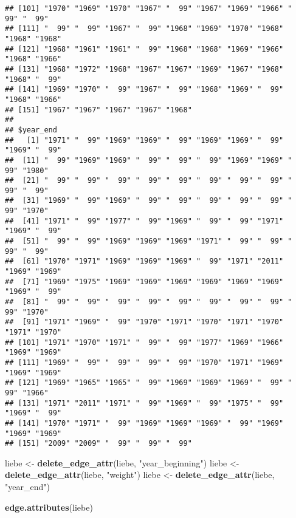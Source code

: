 \documentclass[
]{article}
\newenvironment{Shaded}{\begin{snugshade}}{\end{snugshade}}
\newcommand{\KeywordTok}[1]{\textcolor[rgb]{0.13,0.29,0.53}{\textbf{#1}}}
\newcommand{\NormalTok}[1]{#1}
\newcommand{\StringTok}[1]{\textcolor[rgb]{0.31,0.60,0.02}{#1}}
\begin{document}
\begin{verbatim}
## [101] "1970" "1969" "1970" "1967" "  99" "1967" "1969" "1966" "  99" "  99"
## [111] "  99" "  99" "1967" "  99" "1968" "1969" "1970" "1968" "1968" "1968"
## [121] "1968" "1961" "1961" "  99" "1968" "1968" "1969" "1966" "1968" "1966"
## [131] "1968" "1972" "1968" "1967" "1967" "1969" "1967" "1968" "1968" "  99"
## [141] "1969" "1970" "  99" "1967" "  99" "1968" "1969" "  99" "1968" "1966"
## [151] "1967" "1967" "1967" "1967" "1968"
## 
## $year_end
##   [1] "1971" "  99" "1969" "1969" "  99" "1969" "1969" "  99" "1969" "  99"
##  [11] "  99" "1969" "1969" "  99" "  99" "  99" "1969" "1969" "  99" "1980"
##  [21] "  99" "  99" "  99" "  99" "  99" "  99" "  99" "  99" "  99" "  99"
##  [31] "1969" "  99" "1969" "  99" "  99" "  99" "  99" "  99" "  99" "1970"
##  [41] "1971" "  99" "1977" "  99" "1969" "  99" "  99" "1971" "1969" "  99"
##  [51] "  99" "  99" "1969" "1969" "1969" "1971" "  99" "  99" "  99" "  99"
##  [61] "1970" "1971" "1969" "1969" "1969" "  99" "1971" "2011" "1969" "1969"
##  [71] "1969" "1975" "1969" "1969" "1969" "1969" "1969" "1969" "1969" "  99"
##  [81] "  99" "  99" "  99" "  99" "  99" "  99" "  99" "  99" "  99" "1970"
##  [91] "1971" "1969" "  99" "1970" "1971" "1970" "1971" "1970" "1971" "1970"
## [101] "1971" "1970" "1971" "  99" "  99" "1977" "1969" "1966" "1969" "1969"
## [111] "1969" "  99" "  99" "  99" "  99" "1970" "1971" "1969" "1969" "1969"
## [121] "1969" "1965" "1965" "  99" "1969" "1969" "1969" "  99" "  99" "1966"
## [131] "1971" "2011" "1971" "  99" "1969" "  99" "1975" "  99" "1969" "  99"
## [141] "1970" "1971" "  99" "1969" "1969" "1969" "  99" "1969" "1969" "1969"
## [151] "2009" "2009" "  99" "  99" "  99"
\end{verbatim}

\begin{Shaded}
\begin{Highlighting}[]
\NormalTok{liebe <-}\StringTok{ }\KeywordTok{delete_edge_attr}\NormalTok{(liebe, }\StringTok{"year_beginning"}\NormalTok{)}
\NormalTok{liebe <-}\StringTok{ }\KeywordTok{delete_edge_attr}\NormalTok{(liebe, }\StringTok{"weight"}\NormalTok{)}
\NormalTok{liebe <-}\StringTok{ }\KeywordTok{delete_edge_attr}\NormalTok{(liebe, }\StringTok{"year_end"}\NormalTok{)}

\KeywordTok{edge.attributes}\NormalTok{(liebe)}
\end{Highlighting}
\end{Shaded}
\end{document}
